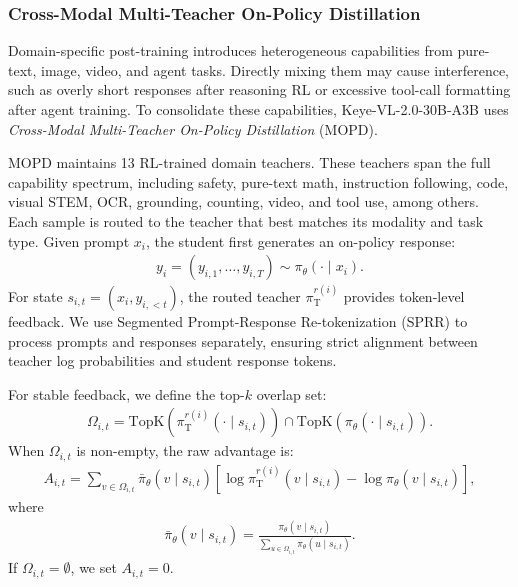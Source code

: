\documentclass{article} %
\begin{document}
\subsubsection{Cross-Modal Multi-Teacher On-Policy Distillation}
\label{sec:mopd}

Domain-specific post-training introduces heterogeneous capabilities from pure-text, image, video, and agent tasks. Directly mixing them may cause interference, such as overly short responses after reasoning RL or excessive tool-call formatting after agent training. To consolidate these capabilities, Keye-VL-2.0-30B-A3B uses \emph{Cross-Modal Multi-Teacher On-Policy Distillation} (MOPD).

MOPD maintains 13 RL-trained domain teachers. These teachers span the full capability spectrum, including safety, pure-text math, instruction following, code, visual STEM, OCR, grounding, counting, video, and tool use, among others. Each sample is routed to the teacher that best matches its modality and task type. Given prompt $x_i$, the student first generates an on-policy response:
\begin{align}
    y_i=(y_{i,1},\ldots,y_{i,T}) \sim \pi_\theta(\cdot \mid x_i).
\end{align}
For state $s_{i,t}=(x_i,y_{i,<t})$, the routed teacher $\pi_{\mathrm{T}}^{r(i)}$ provides token-level feedback. We use Segmented Prompt-Response Re-tokenization (SPRR) to process prompts and responses separately, ensuring strict alignment between teacher log probabilities and student response tokens.

For stable feedback, we define the top-$k$ overlap set:
\begin{align}
    \Omega_{i,t}=
    \mathrm{TopK}\left(\pi_{\mathrm{T}}^{r(i)}(\cdot \mid s_{i,t})\right)
    \cap
    \mathrm{TopK}\left(\pi_{\theta}(\cdot \mid s_{i,t})\right).
\end{align}
When $\Omega_{i,t}$ is non-empty, the raw advantage is:
\begin{align}
    A_{i,t}=
    \sum_{v\in\Omega_{i,t}}
    \bar{\pi}_{\theta}(v\mid s_{i,t})
    \left[
    \log \pi_{\mathrm{T}}^{r(i)}(v\mid s_{i,t}) -
    \log \pi_{\theta}(v\mid s_{i,t})
    \right],
\end{align}
where
\begin{align}
    \bar{\pi}_{\theta}(v\mid s_{i,t})=
    \frac{\pi_{\theta}(v\mid s_{i,t})}
    {\sum_{u\in\Omega_{i,t}}\pi_{\theta}(u\mid s_{i,t})}.
\end{align}
If $\Omega_{i,t}=\emptyset$, we set $A_{i,t}=0$.
\end{document}
